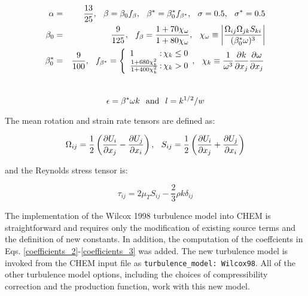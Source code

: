 \begin{eqnarray}
\nonumber
\alpha &=& \frac{13}{25}, \hspace{0.1in}
\beta = \beta_0 f_{\beta}, \hspace{0.1in}
\beta^* = \beta_{0}^* f_{\beta^*}, \hspace{0.1in}
\sigma = 0.5, \hspace{0.1in}
\sigma^* = 0.5
\label{coefficients_1}\\
\beta_0 &=& \frac{9}{125}, \hspace{0.1in}
f_{\beta} = \frac{1 + 70 \chi_{\omega}}{1 + 80 \chi_{\omega}}, \hspace{0.1in}
\chi_{\omega} \equiv \left|{\frac{\Omega_{ij} \Omega_{jk} S_{ki}}{(\beta_{0}^* \omega)^3}} \right|
\label{coefficients_2}\\
\nonumber
\beta_{0}^* &=& \frac{9}{100}, \hspace{0.1in}
f_{\beta^*} = \left\{ \begin{array} {l@{\,:\,}r}
1
& \chi_k \leq 0 \\
\frac{1 + 680 \chi_{k}^2}{1 + 400 \chi_{k}^2}
& \chi_k > 0 \\
\end{array}, \hspace{0.1in}
\chi_{k} \equiv \frac{1}{\omega^3} \frac{\partial{k}} {\partial{x_j}} \frac{\partial{\omega}} {\partial{x_j}} \right .
\label{coefficients_3}
\end{eqnarray} \\

\begin{equation}
\epsilon = \beta^* \omega k  \hspace{0.1in} \text{and} \hspace{0.1in}
l = k^{1/2}/w
\label{coefficients_4}
\end{equation}

The mean rotation and strain rate tensors are defined as:

\begin{equation}
\Omega_{ij} = \frac{1}{2} \left( \frac{\partial{U_i}} {\partial{x_j}} - \frac{\partial{U_j}} {\partial{x_i}} \right), \hspace{0.1in}
S_{ij} = \frac{1}{2} \left( \frac{\partial{U_i}} {\partial{x_j}} + \frac{\partial{U_j}} {\partial{x_i}} \right)
\end{equation}

\noindent
and the Reynolds stress tensor is:

\begin{equation}
\tau_{ij} = 2 \mu_T S_{ij} - \frac{2}{3} \rho k \delta_{ij}
\end{equation}


The implementation of the Wilcox 1998 turbulence model into CHEM is
straightforward and requires only the modification of existing source
terms and the definition of new constants.  In addition, the
computation of the coeffcients in Eqs.
\ref{coefficients_2}-\ref{coefficients_3} was added.  The new
turbulence model is invoked from the CHEM input file as
\verb!turbulence_model: Wilcox98!.  All of the other turbulence model
options, including the choices of compressibility correction and the
production function, work with this new model.


